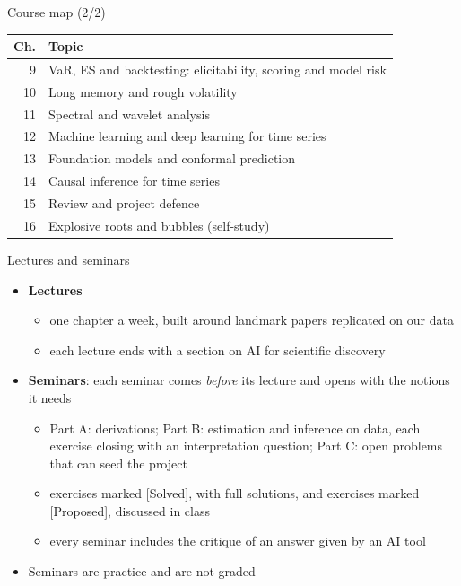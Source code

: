 \begin{frame}{Course map (2/2)}
\begin{center}
\footnotesize
\begin{tabular}{rl}
\toprule
\textbf{Ch.} & \textbf{Topic} \\
\midrule
9 & VaR, ES and backtesting: elicitability, scoring and model risk \\
10 & Long memory and rough volatility \\
11 & Spectral and wavelet analysis \\
12 & Machine learning and deep learning for time series \\
13 & Foundation models and conformal prediction \\
14 & Causal inference for time series \\
15 & Review and project defence \\
16 & Explosive roots and bubbles (self-study) \\
\bottomrule
\end{tabular}
\end{center}
\end{frame}

\begin{frame}{Lectures and seminars}
\itemsize{\footnotesize}
\begin{itemize}
    \item \textbf{Lectures}
    \begin{itemize}
        \item one chapter a week, built around landmark papers replicated on our data
        \item each lecture ends with a section on AI for scientific discovery
    \end{itemize}
    \item \textbf{Seminars}: each seminar comes \emph{before} its lecture and opens with the notions it needs
    \begin{itemize}
        \item Part A: derivations; Part B: estimation and inference on data, each exercise closing with an interpretation question; Part C: open problems that can seed the project
        \item exercises marked [Solved], with full solutions, and exercises marked [Proposed], discussed in class
        \item every seminar includes the critique of an answer given by an AI tool
    \end{itemize}
    \item Seminars are practice and are not graded
\end{itemize}
\end{frame}

